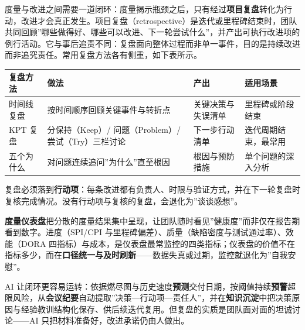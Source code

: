 \documentclass[
]{ctexbook}
\newcounter{none}
\begin{document}
度量与改进之间需要一道闭环：度量揭示瓶颈之后，只有经过\textbf{项目复盘}转化为行动，改进才会真正发生。项目复盘（retrospective）是迭代或里程碑结束时，团队共同回顾''哪些做得好、哪些可以改进、下一轮尝试什么''，并产出可执行改进项的例行活动。它与事后追责不同：复盘面向整体过程而非单一事件，目的是持续改进而非追究责任。常用复盘方法各有侧重，如下表所示。

{\def\LTcaptype{none} %
\begin{longtable}[]{@{}
  >{\raggedright\arraybackslash}p{}
  >{\raggedright\arraybackslash}p{}
  >{\raggedright\arraybackslash}p{}
  >{\raggedright\arraybackslash}p{}@{}}
\toprule\noalign{}
\begin{minipage}[b]{\linewidth}\raggedright
复盘方法
\end{minipage} & \begin{minipage}[b]{\linewidth}\raggedright
做法
\end{minipage} & \begin{minipage}[b]{\linewidth}\raggedright
产出
\end{minipage} & \begin{minipage}[b]{\linewidth}\raggedright
适用场景
\end{minipage} \\
\midrule\noalign{}
\endhead
\bottomrule\noalign{}
\endlastfoot
时间线复盘 & 按时间顺序回顾关键事件与转折点 & 关键决策与失误清单 &
里程碑或阶段结束 \\
KPT 复盘 & 分保持（Keep）/ 问题（Problem）/ 尝试（Try）三栏讨论 &
下一步行动清单 & 迭代周期结束，最常用 \\
五个为什么 & 对问题连续追问''为什么''直至根因 & 根因与预防措施 &
单个问题的深入分析 \\
\end{longtable}
}

复盘必须落到\textbf{行动项}：每条改进都有负责人、时限与验证方式，并在下一轮复盘时复核完成情况。没有行动项与复核的复盘，会退化为''谈谈感想''。

\textbf{度量仪表盘}把分散的度量结果集中呈现，让团队随时看见''健康度''而非仅在报告期看到数字。进度（SPI/CPI
与里程碑偏差）、质量（缺陷密度与测试通过率）、效能（DORA
四指标）与成本，是仪表盘最常监控的四类指标；仪表盘的价值不在指标多少，而在\textbf{口径统一与及时刷新}------数据失真或过期，监控就退化为''自我安慰''。

AI
让闭环更容易运转：依据燃尽图与历史速度\textbf{预测}交付日期，按阈值持续\textbf{预警}超限风险，从\textbf{会议纪要}自动提取''决策---行动项---责任人''，并在\textbf{知识沉淀}中把决策原因与经验教训结构化保存、供后续迭代复用。但复盘的实质是团队面对面的坦诚讨论------AI
只把材料准备好，改进承诺仍由人做出。
\end{document}
